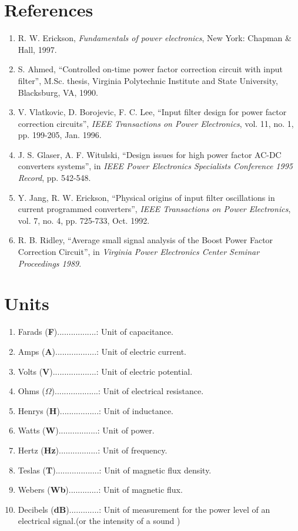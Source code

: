 \documentclass{article}
\begin{document}
\section{References}

\begin{enumerate}
    
    \item R. W. Erickson, \textit{Fundamentals of power electronics}, New York: Chapman \& Hall, 1997.
    \item S. Ahmed, “Controlled on-time power factor correction circuit with input filter”, M.Sc. thesis, Virginia Polytechnic Institute and State University, Blacksburg, VA, 1990.
    \item V. Vlatkovic, D. Borojevic, F. C. Lee, “Input filter design for power factor correction circuits”, \textit{IEEE Transactions on Power Electronics}, vol. 11, no. 1, pp. 199-205, Jan. 1996.
    \item J. S. Glaser, A. F. Witulski, “Design issues for high power factor AC-DC converters systems”, in \textit{IEEE Power Electronics Specialists Conference 1995 Record}, pp. 542-548.
    \item Y. Jang, R. W. Erickson, “Physical origins of input filter oscillations in current programmed converters”, \textit{IEEE Transactions on Power Electronics}, vol. 7, no. 4, pp. 725-733, Oct. 1992.
    \item R. B. Ridley, “Average small signal analysis of the Boost Power Factor Correction Circuit”, in \textit{Virginia Power Electronics Center Seminar Proceedings 1989}.
\end{enumerate}
\section{Units}

\begin{enumerate}
    \item Farads (\textbf{F}).................: Unit of capacitance.
    \item Amps (\textbf{A})..................: Unit of electric current.
    \item Volts (\textbf{V})...................: Unit of electric potential.
    \item Ohms (\textbf{$\Omega$})...................: Unit of electrical resistance.
    \item Henrys (\textbf{H}).................: Unit of inductance.
    \item Watts (\textbf{W}).................: Unit of power.
    \item Hertz (\textbf{Hz}).................: Unit of frequency.
    \item Teslas (\textbf{T})...................: Unit of magnetic flux density.
    \item Webers (\textbf{Wb}).............: Unit of magnetic flux.
    \item Decibels (\textbf{dB}).............: Unit of measurement for the power level of an electrical signal.(or the intensity of a sound )
\end{enumerate}
\end{document}
